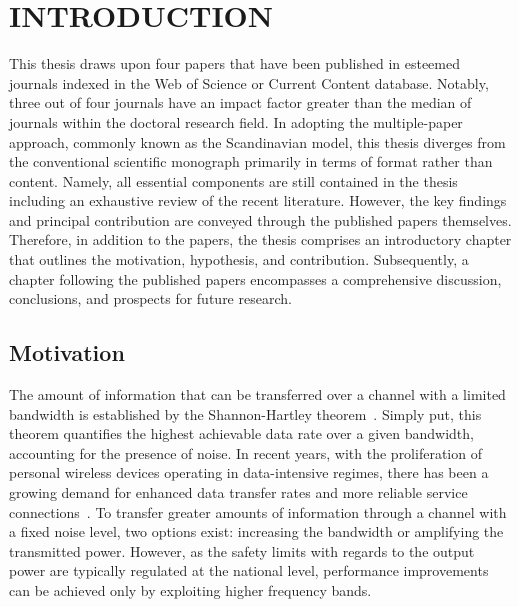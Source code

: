 \cleardoublepage

\chapter{INTRODUCTION}
\label{chap:1}

This thesis draws upon four papers that have been published in esteemed journals indexed in the Web of Science or Current Content database.
Notably, three out of four journals have an impact factor greater than the median of journals within the doctoral research field.
In adopting the multiple-paper approach, commonly known as the Scandinavian model, this thesis diverges from the conventional scientific monograph primarily in terms of format rather than content. 
Namely, all essential components are still contained in the thesis including an exhaustive review of the recent literature.
However, the key findings and principal contribution are conveyed through the published papers themselves.
Therefore, in addition to the papers, the thesis comprises an introductory chapter that outlines the motivation, hypothesis, and contribution.
Subsequently, a chapter following the published papers encompasses a comprehensive discussion, conclusions, and prospects for future research.
		
\section{Motivation}
\label{sec:motivation}
The amount of information that can be transferred over a channel with a limited bandwidth is established by the Shannon-Hartley theorem~\cite{Hartley1928Theorem}.
Simply put, this theorem quantifies the highest achievable data rate over a given bandwidth, accounting for the presence of noise.
In recent years, with the proliferation of personal wireless devices operating in data-intensive regimes, there has been a growing demand for enhanced data transfer rates and more reliable service connections~\cite{Wu2015Safe}.
To transfer greater amounts of information through a channel with a fixed noise level, two options exist: increasing the bandwidth or amplifying the transmitted power.
However, as the safety limits with regards to the output power are typically regulated at the national level, performance improvements can be achieved only by exploiting higher frequency bands.


